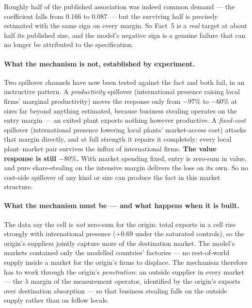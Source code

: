 \documentclass[11pt]{article}
\theoremstyle{plain}
\theoremstyle{remark}
\theoremstyle{definition}
\begin{document}
\noindent Roughly half of the published association was indeed common demand --- the
coefficient falls from $0.166$ to $0.087$ --- but the surviving half is precisely
estimated with the same sign on every margin. So Fact~5 is a \emph{real} target at
about half its published size, and the model's negative sign is a genuine failure that
can no longer be attributed to the specification.

\paragraph{What the mechanism is not, established by experiment.} Two spillover
channels have now been tested against the fact and both fail, in an instructive
pattern. A \emph{productivity} spillover (international presence raising local firms'
marginal productivity) moves the response only from $-97\%$ to $-60\%$ at sizes far
beyond anything estimated, because business stealing operates on the entry margin ---
an exited plant exports nothing however productive. A \emph{fixed-cost} spillover
(international presence lowering local plants' market-access cost) attacks that margin
directly, and at full strength it repairs it completely: every local plant--market
pair survives the influx of international firms. \textbf{The value response is still
$-80\%$.} With market spending fixed, entry is zero-sum in value, and pure
share-stealing on the intensive margin delivers the loss on its own. So no cost-side
spillover of any kind or size can produce the fact in this market structure.

\paragraph{What the mechanism must be --- and what happens when it is built.} The
data say the cell is \emph{not} zero-sum for the origin: total exports in a cell rise
strongly with international presence ($+0.69$ under the saturated controls), so the
origin's suppliers jointly capture more of the destination market. The model's markets
contained only the modelled countries' factories --- no rest-of-world supply inside a
market for the origin's firms to displace. The mechanism therefore has to work through
the origin's \emph{penetration}: an outside supplier in every market --- the $\lambda$
margin of the measurement operator, identified by the origin's exports over
destination absorption --- so that business stealing falls on the outside supply
rather than on fellow locals.
\end{document}
